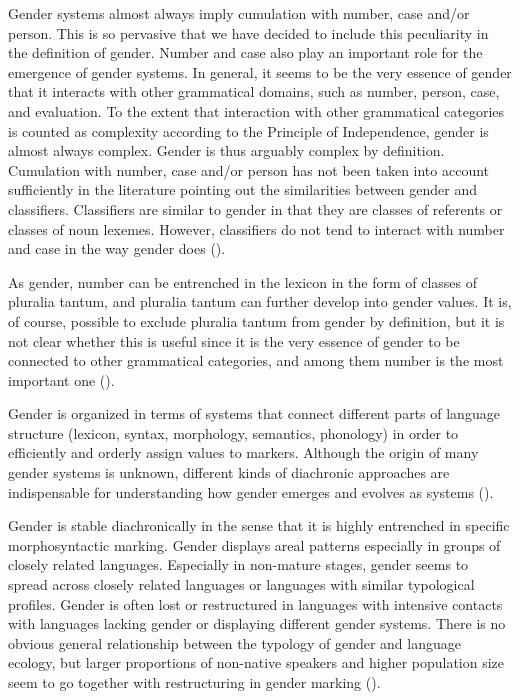 \documentclass[output=collectionpaper]{langsci/langscibook}
\begin{document}
Gender systems almost always imply cumulation with number, case and/or person. This is so pervasive that we have decided to include this peculiarity in the definition of gender. Number and case also play an important role for the emergence of gender systems. In general, it seems to be the very essence of gender that it interacts with other grammatical domains, such as number, person, case, and evaluation. To the extent that interaction with other grammatical categories is counted as complexity according to the Principle of Independence, gender is almost always complex. Gender is thus arguably complex by definition. Cumulation with number, case and/or person has not been taken into account sufficiently in the literature pointing out the similarities between gender and classifiers. Classifiers are similar to gender in that they are classes of referents or classes of noun lexemes. However, classifiers do not tend to interact with number and case in the way gender does ().

As gender, number can be entrenched in the lexicon in the form of classes of pluralia tantum, and pluralia tantum can further develop into gender values. It is, of course, possible to exclude pluralia tantum from gender by definition, but it is not clear whether this is useful since it is the very essence of gender to be connected to other grammatical categories, and among them number is the most important one ().

Gender is organized in terms of systems that connect different parts of language structure (lexicon, syntax, morphology, semantics, phonology) in order to efficiently and orderly assign values to markers. Although the origin of many gender systems is unknown, different kinds of diachronic approaches are indispensable for understanding how gender emerges and evolves as systems ().

Gender is stable diachronically in the sense that it is highly entrenched in specific morphosyntactic marking. Gender displays areal patterns especially in groups of closely related languages. Especially in non-mature stages, gender seems to spread across closely related languages or languages with similar typological profiles. Gender is often lost or restructured in languages with intensive contacts with languages lacking gender or displaying different gender systems. There is no obvious general relationship between the typology of gender and language ecology, but larger proportions of non-native speakers and higher population size seem to go together with restructuring in gender marking ().
\end{document}
